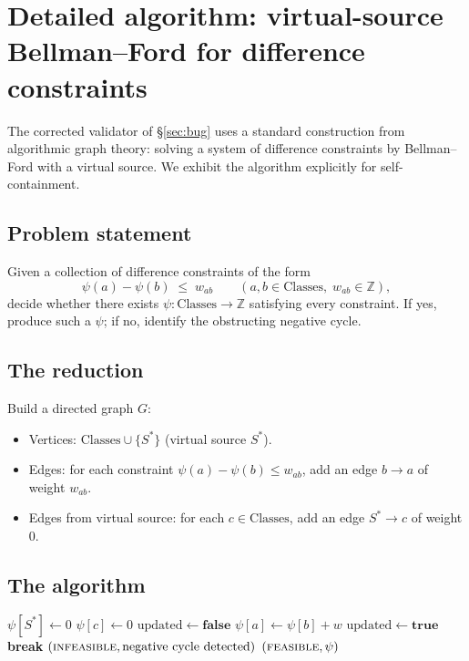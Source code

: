 \documentclass[11pt,a4paper]{article}
\theoremstyle{plain}
\theoremstyle{definition}
\newcommand{\ZZ}{\mathbb{Z}}
\begin{document}
\section{Detailed algorithm: virtual-source Bellman--Ford for difference constraints}\label{app:bf-detail}

The corrected validator of \S\ref{sec:bug} uses a standard
construction from algorithmic graph theory: solving a system of
difference constraints by Bellman--Ford with a virtual source.
We exhibit the algorithm explicitly for self-containment.

\subsection*{Problem statement}

Given a collection of difference constraints of the form
\[
   \psi(a) - \psi(b) \;\le\; w_{ab} \qquad (a, b \in \mathrm{Classes},\; w_{ab} \in \ZZ),
\]
decide whether there exists $\psi : \mathrm{Classes} \to \ZZ$ satisfying
every constraint. If yes, produce such a $\psi$; if no, identify
the obstructing negative cycle.

\subsection*{The reduction}

Build a directed graph $G$:
\begin{itemize}
   \item Vertices: $\mathrm{Classes} \cup \{S^{*}\}$ (virtual
         source $S^{*}$).
   \item Edges: for each constraint $\psi(a) - \psi(b) \le w_{ab}$,
         add an edge $b \to a$ of weight $w_{ab}$.
   \item Edges from virtual source: for each $c \in \mathrm{Classes}$,
         add an edge $S^{*} \to c$ of weight $0$.
\end{itemize}

\subsection*{The algorithm}

\begin{algorithm}[H]
\caption{Virtual-source Bellman--Ford for difference constraints}
\label{alg:bf-diff}
\begin{algorithmic}[1]
\State $\psi[S^{*}] \gets 0$
  \State $\psi[c] \gets 0$
\EndFor
{}
  \State $\mathrm{updated} \gets \mathbf{false}$
      \State $\psi[a] \gets \psi[b] + w$
      \State $\mathrm{updated} \gets \mathbf{true}$
    \EndIf
  \EndFor
    \State \textbf{break}    
  \EndIf
    \State \Return $(\textsc{infeasible}, \text{negative cycle detected})$
  \EndIf
\EndFor
\State \Return $(\textsc{feasible}, \psi)$
\end{algorithmic}
\end{algorithm}
\end{document}
